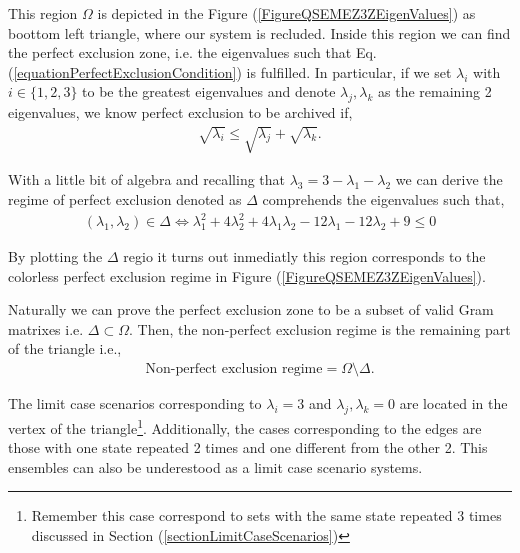 \documentclass[12pt,letterpaper]{article}
\begin{document}
This region $\Omega$ is depicted in the Figure (\ref{FigureQSEMEZ3ZEigenValues}) as boottom left triangle, where our system is recluded. Inside this region we can find the perfect exclusion zone, i.e. the eigenvalues such that Eq.(\ref{equationPerfectExclusionCondition}) is fulfilled. In particular, if we set $\lambda_i$ with $i\in\{1,2,3\}$ to be the greatest eigenvalues and denote $\lambda_j,\lambda_k$ as the remaining 2 eigenvalues, we know perfect exclusion to be archived if,
\begin{align*}
	\sqrt{\lambda_i}\leq \sqrt{\lambda_j}+\sqrt{\lambda_k}.
\end{align*}

With a little bit of algebra and recalling that $\lambda_3=3-\lambda_1-\lambda_2$ we can derive the regime of perfect exclusion denoted as $\Delta$ comprehends the eigenvalues such that,
\begin{align*}
	(\lambda_1,\lambda_2)\in \Delta\Leftrightarrow\lambda_1^2 + 4\lambda_2^2 + 4\lambda_1\lambda_2 - 12\lambda_1 - 12\lambda_2 + 9 \leq 0
\end{align*}

By plotting the $\Delta$ regio it turns out inmediatly this region corresponds to the colorless perfect exclusion regime in Figure (\ref{FigureQSEMEZ3ZEigenValues}).


Naturally we can prove the perfect exclusion zone to be a subset of valid Gram matrixes i.e. $\Delta\subset \Omega$. Then, the non-perfect exclusion regime is the remaining part of the triangle i.e.,
\begin{align*}
	\text{Non-perfect exclusion regime}=\Omega\setminus \Delta.
\end{align*}

The limit case scenarios corresponding to $\lambda_i=3$ and $\lambda_j,\lambda_k=0$ are located in the vertex of the triangle\footnote{Remember this case correspond to sets with the same state repeated 3 times discussed in Section (\ref{sectionLimitCaseScenarios})}. Additionally, the cases corresponding to the edges are those with one state repeated 2 times and one different from the other 2. This ensembles can also be underestood as a limit case scenario systems.
\end{document}
